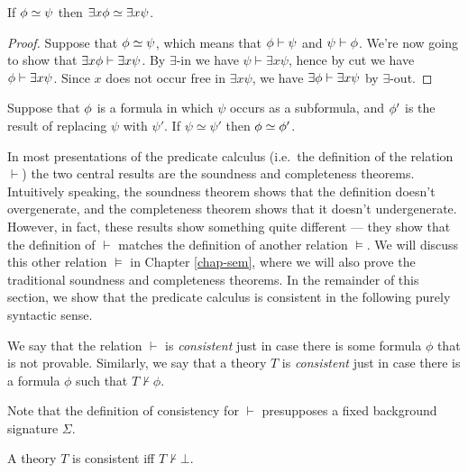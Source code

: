 \begin{lemma} If $\phi\simeq \psi$ then
  $\exists x\phi\simeq \exists x\psi$. \end{lemma}

\begin{proof} Suppose that $\phi\simeq\psi$, which means that
  $\phi\vdash \psi$ and $\psi\vdash \phi$.  We're now going to show that
  $\exists x\phi\vdash\exists x\psi$.  By $\exists$-in we have
  $\psi\vdash \exists x\psi$, hence by cut we have
  $\phi\vdash\exists x\psi$.  Since $x$ does not occur free in
  $\exists x\psi$, we have $\exists \phi\vdash \exists x\psi$ by
  $\exists$-out.  \end{proof}

\begin{thm}[Replacement] Suppose that $\phi$ is a formula in which
  $\psi$ occurs as a subformula, and $\phi '$ is the result of
  replacing $\psi$ with $\psi '$.  If $\psi \simeq \psi '$ then
  $\phi \simeq \phi '$.
\end{thm}

In most presentations of the predicate calculus (i.e.\ the definition
of the relation $\vdash$) the two central results are the soundness
and completeness theorems.  Intuitively speaking, the soundness
theorem shows that the definition doesn't overgenerate, and the
completeness theorem shows that it doesn't undergenerate.  However, in
fact, these results show something quite different --- they show that
the definition of $\vdash$ matches the definition of another relation
$\vDash$.  We will discuss this other relation $\vDash$ in Chapter
\ref{chap-sem}, where we will also prove the traditional soundness and
completeness theorems.  In the remainder of this section, we show that
the predicate calculus is consistent in the following purely syntactic
sense.

\begin{defn} We say that the relation $\vdash$ is \emph{consistent}
  just in case there is some formula $\phi$ that is not provable.
  Similarly, we say that a theory $T$ is \emph{consistent} just in
  case there is a formula $\phi$ such that
  $T\not\vdash\phi$. \end{defn}

Note that the definition of consistency for $\vdash$ presupposes a
fixed background signature $\Sigma$.

\begin{prop} A theory $T$ is consistent iff
  $T\not\vdash\bot$.  \end{prop}

